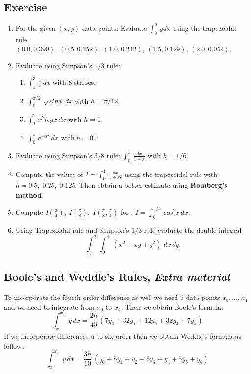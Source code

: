 \documentclass[aima203_lecturenotes_ku.tex]{subfiles}
\begin{document}
\subsection{Exercise}
\begin{enumerate}
\item For the given $(x,y)$ data points: Evaluate $\int_0^2 \, ydx$ using the trapezoidal rule.\\  $(0.0,0.399),\, (0.5,0.352),\,(1.0,0.242),\, (1.5,0.129),\,(2.0,0.054)$.

\item Evaluate using Simpson's $1/3$ rule:
  \begin{enumerate}
  \item $\displaystyle \int_1^3 \, \frac{1}{x}\,dx$  with $8$ stripes.
  \item $\displaystyle \int_0^{\pi /2} \, \sqrt{sinx}\, dx$ with $h= \pi /12$.

  \item $\displaystyle \int_3^7 \, x^2logx\, dx $ with $h= 1$.
    \item $\displaystyle \int_0^1 \, e^{-x^2} \, dx$ with $h=0.1$
  \end{enumerate}

\item Evaluate using Simpson's $3/8$ rule: $\displaystyle \int_0^1 \, \frac{dx}{1+x}$ with $h=1/6$.

\item Compute the values of $I = \displaystyle \int_0^1 \, \frac{dx}{1+x^2}$ using the trapezoidal rule with $h=0.5, \; 0.25, \; 0.125$. Then obtain a better estimate using \textbf{Romberg's method}.

\item Compute $\displaystyle I\left (\frac{\pi}{4} \right ), \; I\left (\frac{\pi}{8} \right ), \; I\left (\frac{\pi}{8}, \frac{\pi}{4} \right )$ for : $I = \displaystyle \int_0^{\pi/4} \, cos^2x\, dx$.

\item Using Trapezoidal rule and Simpson's $1/3$ rule evaluate the double integral $$\int_{_2}^2 \, \int_0^4 \; (x^2 -xy + y^2) \; dx\, dy.$$

\end{enumerate}
\subsection{Boole's and Weddle's Rules, \textit{Extra material}}
To incorporate the fourth order difference as well we need $5$ data points $x_0, ..., x_4$ and we need to integrate from $x_0$ to $x_4$. Then we obtain Boole's formula:
\begin{equation}
  \label{Boole's}
  \displaystyle \int_{x_0}^{x_4} \; y\,dx = \frac{2h}{45}\, (7y_0 + 32y_1 + 12y_2+32y_3+7y_4)
\end{equation}
If we incorporate differences u to six order then we obtain Weddle's formula as follows:
\begin{equation}
  \label{Weddle's}
  \displaystyle \int_{x_0}^{x_6} \; y\,dx = \frac{3h}{10}\, (y_0 + 5y_1 + y_2+6y_3+y_4+5y_5+y_6)
\end{equation}
\end{document}
